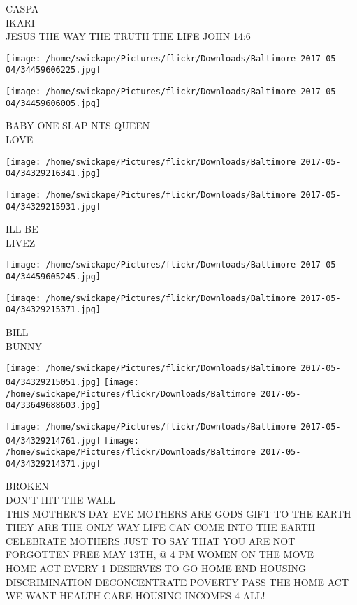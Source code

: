 \documentclass[10pt,letterpaper]{article}
\begin{document}
CASPA\\
IKARI\\
JESUS THE WAY THE TRUTH THE LIFE JOHN 14:6
\pagebreak

\texttt{[image: /home/swickape/Pictures/flickr/Downloads/Baltimore 2017-05-04/34459606225.jpg]}

\vspace{0.25in}
\texttt{[image: /home/swickape/Pictures/flickr/Downloads/Baltimore 2017-05-04/34459606005.jpg]}

BABY ONE SLAP NTS QUEEN\\
LOVE
\pagebreak

\texttt{[image: /home/swickape/Pictures/flickr/Downloads/Baltimore 2017-05-04/34329216341.jpg]}

\vspace{0.25in}
\texttt{[image: /home/swickape/Pictures/flickr/Downloads/Baltimore 2017-05-04/34329215931.jpg]}

ILL BE\\
LIVEZ
\pagebreak

\texttt{[image: /home/swickape/Pictures/flickr/Downloads/Baltimore 2017-05-04/34459605245.jpg]}

\vspace{0.25in}
\texttt{[image: /home/swickape/Pictures/flickr/Downloads/Baltimore 2017-05-04/34329215371.jpg]}

BILL\\
BUNNY
\pagebreak

\texttt{[image: /home/swickape/Pictures/flickr/Downloads/Baltimore 2017-05-04/34329215051.jpg]}
\texttt{[image: /home/swickape/Pictures/flickr/Downloads/Baltimore 2017-05-04/33649688603.jpg]}

\texttt{[image: /home/swickape/Pictures/flickr/Downloads/Baltimore 2017-05-04/34329214761.jpg]}
\texttt{[image: /home/swickape/Pictures/flickr/Downloads/Baltimore 2017-05-04/34329214371.jpg]}

BROKEN\\
DON'T HIT THE WALL\\
THIS MOTHER'S DAY EVE MOTHERS ARE GODS GIFT TO THE EARTH THEY ARE THE ONLY WAY LIFE CAN COME INTO THE EARTH CELEBRATE MOTHERS JUST TO SAY THAT YOU ARE NOT FORGOTTEN FREE MAY 13TH, @ 4 PM WOMEN ON THE MOVE\\
HOME ACT EVERY 1 DESERVES TO GO HOME END HOUSING DISCRIMINATION DECONCENTRATE POVERTY PASS THE HOME ACT WE WANT HEALTH CARE HOUSING INCOMES 4 ALL!
\pagebreak
\end{document}
